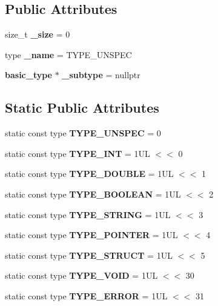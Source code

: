 \subsection*{Public Attributes}
\begin{DoxyCompactItemize}
\item 
\mbox{\label{structbasic__type_a7d0e7cd683e46caea2c165fb8ebf26c5}} 
size\+\_\+t {\bfseries \+\_\+size} = 0
\item 
\mbox{\label{structbasic__type_a3fc97d3a8fc1f7ab3d037359ad705a42}} 
type {\bfseries \+\_\+name} = T\+Y\+P\+E\+\_\+\+U\+N\+S\+P\+EC
\item 
\mbox{\label{structbasic__type_a2ce9b0a06193a2bd685f106bc72a6089}} 
\textbf{ basic\+\_\+type} $\ast$ {\bfseries \+\_\+subtype} = nullptr
\end{DoxyCompactItemize}
\subsection*{Static Public Attributes}
\begin{DoxyCompactItemize}
\item 
\mbox{\label{structbasic__type_a7787995e345f10d3cc6c48d0708c8a36}} 
static const type {\bfseries T\+Y\+P\+E\+\_\+\+U\+N\+S\+P\+EC} = 0
\item 
\mbox{\label{structbasic__type_a6c904b5d042062de5ac5c454bc9426a6}} 
static const type {\bfseries T\+Y\+P\+E\+\_\+\+I\+NT} = 1\+U\+L $<$$<$ 0
\item 
\mbox{\label{structbasic__type_aa8786b1860b50978829feb20e614b4c3}} 
static const type {\bfseries T\+Y\+P\+E\+\_\+\+D\+O\+U\+B\+LE} = 1\+U\+L $<$$<$ 1
\item 
\mbox{\label{structbasic__type_a62f257e76816cc338762e6a1182174ef}} 
static const type {\bfseries T\+Y\+P\+E\+\_\+\+B\+O\+O\+L\+E\+AN} = 1\+U\+L $<$$<$ 2
\item 
\mbox{\label{structbasic__type_a2f6ab0d223597c328005e6c2276f523e}} 
static const type {\bfseries T\+Y\+P\+E\+\_\+\+S\+T\+R\+I\+NG} = 1\+U\+L $<$$<$ 3
\item 
\mbox{\label{structbasic__type_a9ded574c7b6d0a63acd29b87d8c16efe}} 
static const type {\bfseries T\+Y\+P\+E\+\_\+\+P\+O\+I\+N\+T\+ER} = 1\+U\+L $<$$<$ 4
\item 
\mbox{\label{structbasic__type_a0e3320ba9749776fbf1303d353fec55e}} 
static const type {\bfseries T\+Y\+P\+E\+\_\+\+S\+T\+R\+U\+CT} = 1\+U\+L $<$$<$ 5
\item 
\mbox{\label{structbasic__type_a59e3a52115cbe7ac8a43d64072bb98a3}} 
static const type {\bfseries T\+Y\+P\+E\+\_\+\+V\+O\+ID} = 1\+U\+L $<$$<$ 30
\item 
\mbox{\label{structbasic__type_af5146fc165cffff72de991842d60840c}} 
static const type {\bfseries T\+Y\+P\+E\+\_\+\+E\+R\+R\+OR} = 1\+U\+L $<$$<$ 31
\end{DoxyCompactItemize}


